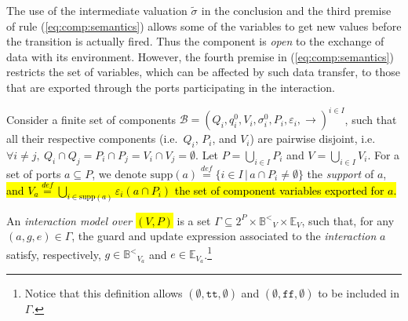 \documentclass{llncs}
\newcommand{\Simon}{\\\hfill\mdash Simon}
\newcommand{\noteSB}[2][color=green!40, size=\tiny]{\todo[#1]{{#2}\Simon}}
\newcommand{\eq}[1]{(\ref{eq:#1})}
\newcommand{\cB}{\ensuremath{\mathcal{B}}}
\newcommand{\sB}{\ensuremath{\mathbb{B}}}
\newcommand{\sE}{\ensuremath{\mathbb{E}}}
\newcommand{\mdash}[1][]{---#1}
\newcommand{\ie}[1][\ ]{i.e.#1}
\newcommand{\bydef}[1]{\ensuremath{\stackrel{\mathit{\scriptscriptstyle def}}{#1}}}
\newcommand{\setdef}[2]{\ensuremath{\{{#1}\,|\,{#2}\}}}
\newcommand{\goesto}[2][]{\ensuremath{\xrightarrow[#1]{#2}}}
\newcommand{\true} {\ensuremath{\mathtt{t\!t}}}
\newcommand{\false}{\ensuremath{\mathtt{f\!f}}}
\newcommand{\noop} {\ensuremath{\emptyset}} %
\newcommand{\ordbool}{\ensuremath{\sB^{<}}}
\newcommand{\guards}[1]{\ensuremath{\ordbool_{#1}}}
\newcommand{\exprs}[1]{\ensuremath{\sE_{#1}}}
\newcommand{\val}[3][]{\ensuremath{#1{\sigma}^{#2}_{#3}}}
\newcommand{\export}[1][]{\ensuremath{\varepsilon_{#1}}}
\newcommand{\supp}[1]{\ensuremath{\mathrm{supp}(#1)}}
\begin{document}
The use of the intermediate valuation $\tilde{\val{}{}}$ in the
conclusion and the third premise of rule \eq{comp:semantics}
allows some of the variables to get new values before the
transition is actually fired.  Thus the component is \emph{open}
to the exchange of data with its environment.  However, the
fourth premise in \eq{comp:semantics} restricts the set of
variables, which can be affected by such data transfer, to those
that are exported through the ports participating in the
interaction.

\begin{definition}
  \label{defn:im}
  Consider a finite set of components $\cB = (Q_i, q^0_i, V_i,
  \val{0}{i}, P_i, \export[i], \goesto{})^{i \in I}$, such that
  all their respective components (\ie $Q_i$, $P_i$, and $V_i$)
  are pairwise disjoint, \ie $\forall i \neq j,\ Q_i \cap Q_j =
  P_i \cap P_j = V_i \cap V_j = \emptyset$.  Let $P = \bigcup_{i
  \in I} P_i$ and $V = \bigcup_{i \in I} V_i$.
%
  For a set of ports $a \subseteq P$, we denote $\supp{a}
  \bydef{=} \setdef{i \in I}{a \cap P_i \neq \emptyset}$ the
  \emph{support} of $a$,
  \noteSB{Updated this}\hl{and $V_a \bydef{=} \bigcup_{i \in
    \supp{a}} \export[i](a \cap P_i)$ the set of component
  variables exported for $a$.}

  An \emph{interaction model over \hl{$(V,P)$}} is a set $\Gamma
  \subseteq 2^P \times \guards{V} \times \exprs{V}$, such that,
  for any $(a, g, e) \in \Gamma$, the guard and update expression
  associated to the \emph{interaction} $a$ satisfy, respectively,
  $g \in \guards{V_a}$ and $e \in \exprs{V_a}$.\footnote{%
%
    Notice that this definition allows $(\emptyset, \true,
    \noop)$ and $(\emptyset, \false, \noop)$ to be included in
    $\Gamma$.
%
  }


\end{definition}
\end{document}

